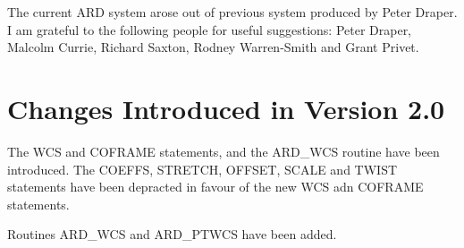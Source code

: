 The current ARD system arose out of previous system produced by Peter Draper. I
am grateful to the following people for useful suggestions: Peter Draper,
Malcolm Currie, Richard Saxton, Rodney Warren-Smith and Grant Privet. 

\section{Changes Introduced in Version 2.0}
The WCS and COFRAME statements, and the ARD\_WCS routine have been introduced.
The COEFFS, STRETCH, OFFSET, SCALE and TWIST statements have been
depracted in favour of the new WCS adn COFRAME statements.

Routines ARD\_WCS and ARD\_PTWCS have been added.


